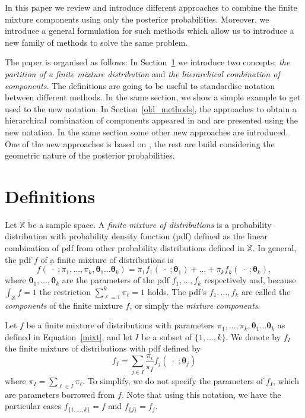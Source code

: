 \documentclass[10pt, a4paper]{article}
\newcommand{\m}[1]{\boldsymbol{#1}}
\begin{document}
In this paper we review and introduce different approaches to combine the finite mixture components using only the posterior probabilities. Moreover, we introduce a general formulation for such methods which allow us to introduce a new family of methods to solve the same problem.

The paper is organised as follows: In Section~\ref{definitions} we introduce two concepts; \emph{the partition of a finite mixture distribution} and \emph{the hierarchical combination of components}. The definitions are going to be useful to standardise notation between different methods. In the same section, we show a simple example to get used to the new notation. In Section~\ref{old_methods}, the approaches to obtain a hierarchical combination of components appeared in \cite{hennig2010methods} and \cite{baudry2010combining} are presented using the new notation. In the same section some other new approaches are introduced. One of the new approaches is based on \cite{longford2014}, the rest are build considering the geometric nature of the posterior probabilities.

\section{Definitions}
\label{definitions}

Let $\mathbb{X}$ be a sample space. A \emph{finite mixture of distributions} is a probability distribution with probability density function (pdf) defined as the linear combination of pdf from other probability distributions defined in $\mathbb{X}$. In general, the pdf $f$ of a finite mixture of distributions is
\begin{equation}\label{mixt}
f(\;\cdot\; ; \pi_1, \dots, \pi_k, \m\theta_1 \dots \m\theta_k) = \pi_1 f_1(\;\cdot\; ; \m\theta_1) + \dots + \pi_k f_k(\;\cdot\; ; \m\theta_k),
\end{equation}
where $\m\theta_1, \dots,  \m\theta_k$ are the parameters of the pdf $f_1, \dots, f_k$ respectively and, because $\int_{\mathbb{X}}f = 1$ the restriction $\sum_{\ell = 1}^k \pi_\ell = 1$ holds. The pdf's $f_1, \dots, f_k$ are called the \emph{components} of the finite mixture $f$, or simply the \emph{mixture components}.

Let $f$ be a finite mixture of distributions with  parameters  $\pi_1, \dots, \pi_k, \m\theta_1 \dots \m\theta_k$ as defined in Equation~\ref{mixt}, and let $I$  be a subset of $\{1, \dots, k\}$. We denote by $f_I$ the finite mixture of distributions with pdf defined by
\[
f_I = \sum_{j \in I} \frac{\pi_i}{\pi_I} f_j(\;\cdot\; ; \m\theta_j)
\]
where $\pi_I = \sum_{\ell \in I} \pi_\ell$. To simplify, we do not specify the parameters of $f_I$, which are parameters borrowed from $f$. Note that using this notation, we have the particular cases $f_{\{1, \dots, k\}} = f$ and $f_{\{j\}} = f_j$.
\end{document}

